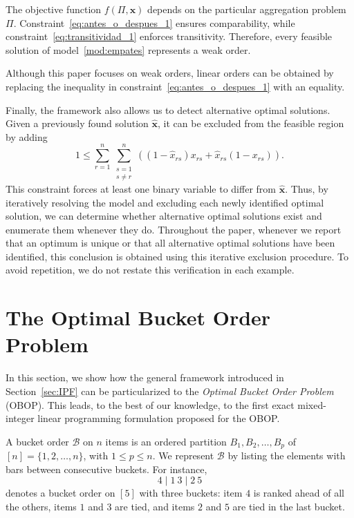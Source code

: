 \documentclass[pdflatex,basic,Numbered]{jnl}%
\theoremstyle{plain}
\theoremstyle{remark}
\theoremstyle{thmstyleone}%
\theoremstyle{thmstylethree}%
\begin{document}
The objective function \(f(\Pi,\bm{x})\) depends on the particular aggregation problem \(\Pi\). Constraint~\eqref{eq:antes_o_despues_1} ensures comparability, while constraint~\eqref{eq:transitividad_1} enforces transitivity. Therefore, every feasible solution of model~\eqref{mod:empates} represents a weak order.

Although this paper focuses on weak orders, linear orders can be obtained by replacing the inequality in constraint~\eqref{eq:antes_o_despues_1} with an equality.

Finally, the framework also allows us to detect alternative optimal solutions. Given a previously found solution \(\hat{\bm{x}}\), it can be excluded from the feasible region by adding
\[
1 \le 
\sum_{r=1}^{n}
\sum_{\substack{s=1\\s\neq r}}^{n}
\left((1-\hat{x}_{rs})x_{rs}
+\hat{x}_{rs}(1-x_{rs})\right).
\]
This constraint forces at least one binary variable to differ from \(\hat{\bm{x}}\). Thus, by iteratively resolving the model and excluding each newly identified optimal solution, we can determine whether alternative optimal solutions exist and enumerate them whenever they do. Throughout the paper, whenever we report that an optimum is unique or that all alternative optimal solutions have been identified, this conclusion is obtained using this iterative exclusion procedure. To avoid repetition, we do not restate this verification in each example.

\section{The Optimal Bucket Order Problem}\label{Sec:OBOP}

In this section, we show how the general framework introduced in Section~\ref{sec:IPF} can be particularized to the \emph{Optimal Bucket Order Problem} (OBOP). This leads, to the best of our knowledge, to the first exact mixed-integer linear programming formulation proposed for the OBOP.

A bucket order \(\mathcal{B}\) on \(n\) items is an ordered partition \(B_1,B_2,\dots,B_p\) of \( [n]=\{1,2,\dots,n\} \), with \(1\le p\le n\). We represent \(\mathcal{B}\) by listing the elements with bars between consecutive buckets. For instance,
\[
4 \mid 1\ 3 \mid 2\ 5
\]
denotes a bucket order on \( [5] \) with three buckets: item \(4\) is ranked ahead of all the others, items \(1\) and \(3\) are tied, and items \(2\) and \(5\) are tied in the last bucket.
\end{document}
